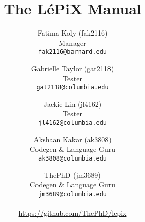 \documentclass[11pt,letterpaper]{report}
\author{
	Fatima Koly (fak2116)\\
	Manager\\
	\texttt{fak2116@barnard.edu}
	\and
	Gabrielle Taylor (gat2118)\\
	Tester\\
	\texttt{gat2118@columbia.edu}
	\and
	Jackie Lin (jl4162)\\
	Tester\\
	\texttt{jl4162@columbia.edu}
	\and
	Akshaan Kakar (ak3808)\\ 
	Codegen \& Language Guru\\
	\texttt{ak3808@columbia.edu}
	\and
	ThePhD (jm3689)\\
	Codegen \& Language Guru\\
	\texttt{jm3689@columbia.edu}
	\\\\
	\url{https://github.com/ThePhD/lepix}
}
\title{The LéPiX Manual}
\begin{document}
	\renewcommand{\arraystretch}{1.1}
	\newcommand{\lepix}{LéPiX}
	\maketitle
	\tableofcontents
	\pagebreak
	
	
	
	
	
\end{document}

